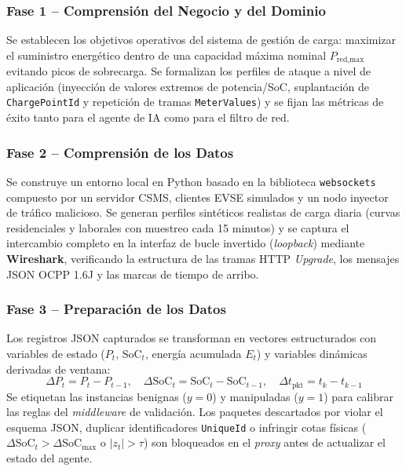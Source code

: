 \documentclass[conference]{IEEEtran}
\begin{document}
\subsubsection{Fase 1 -- Comprensión del Negocio y del Dominio}
Se establecen los objetivos operativos del sistema de gestión de carga: maximizar el suministro energético dentro de una capacidad máxima nominal $P_{\text{red,max}}$ evitando picos de sobrecarga. Se formalizan los perfiles de ataque a nivel de aplicación (inyección de valores extremos de potencia/SoC, suplantación de \texttt{ChargePointId} y repetición de tramas \texttt{MeterValues}) y se fijan las métricas de éxito tanto para el agente de IA como para el filtro de red.

\subsubsection{Fase 2 -- Comprensión de los Datos}
Se construye un entorno local en Python basado en la biblioteca \texttt{websockets} compuesto por un servidor CSMS, clientes EVSE simulados y un nodo inyector de tráfico malicioso. Se generan perfiles sintéticos realistas de carga diaria (curvas residenciales y laborales con muestreo cada 15 minutos) y se captura el intercambio completo en la interfaz de bucle invertido (\textit{loopback}) mediante \textbf{Wireshark}, verificando la estructura de las tramas HTTP \textit{Upgrade}, los mensajes JSON OCPP 1.6J y las marcas de tiempo de arribo.

\subsubsection{Fase 3 -- Preparación de los Datos}
Los registros JSON capturados se transforman en vectores estructurados con variables de estado ($P_t$, $\text{SoC}_t$, energía acumulada $E_t$) y variables dinámicas derivadas de ventana:
\begin{equation}
\Delta P_t = P_t - P_{t-1}, \quad \Delta \text{SoC}_t = \text{SoC}_t - \text{SoC}_{t-1}, \quad \Delta t_{\text{pkt}} = t_k - t_{k-1}
\end{equation}
Se etiquetan las instancias benignas ($y=0$) y manipuladas ($y=1$) para calibrar las reglas del \textit{middleware} de validación. Los paquetes descartados por violar el esquema JSON, duplicar identificadores \texttt{UniqueId} o infringir cotas físicas ($\Delta \text{SoC}_t > \Delta \text{SoC}_{\max}$ o $|z_t| > \tau$) son bloqueados en el \textit{proxy} antes de actualizar el estado del agente.
\end{document}
